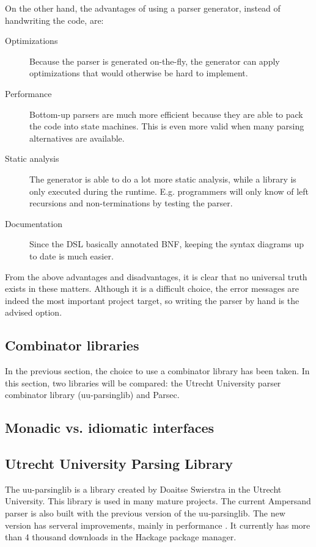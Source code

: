 \noindent
On the other hand, the advantages of using a parser generator, instead of handwriting the code, are:
\begin{description}
	\item[Optimizations] Because the parser is generated on-the-fly, the generator can apply optimizations that would otherwise be hard to implement.
	\item[Performance] Bottom-up parsers are much more efficient because they are able to pack the code into state machines.
		This is even more valid when many parsing alternatives are available.
	\item[Static analysis] The generator is able to do a lot more static analysis, while a library is only executed during the runtime.
    E.g. programmers will only know of left recursions and non-terminations by testing the parser.
	\item[Documentation] Since the DSL basically annotated BNF, keeping the syntax diagrams up to date is much easier.
\end{description}

\noindent
From the above advantages and disadvantages, it is clear that no universal truth exists in these matters.
Although it is a difficult choice, the error messages are indeed the most important project target, so writing the parser by hand is the advised option.

\subsection{Combinator libraries}
In the previous section, the choice to use a combinator library has been taken.
In this section, two libraries will be compared: the Utrecht University parser combinator library (uu-parsinglib) and Parsec.

\subsection{Monadic vs. idiomatic interfaces}

\subsection{Utrecht University Parsing Library}
%
The uu-parsinglib is a library created by Doaitse Swierstra in the Utrecht University.
This library is used in many mature projects.
The current Ampersand parser is also built with the previous version of the uu-parsinglib.
The new version has serveral improvements, mainly in performance \cite{parse-benchmark}.
It currently has more than 4 thousand downloads in the Hackage package manager.

